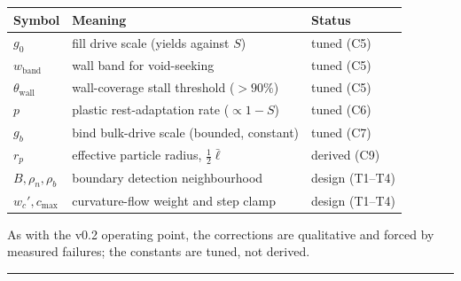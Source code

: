 \documentclass[11pt]{article}
\begin{document}
\begin{center}\small
\begin{tabular}{@{}lll@{}}
\toprule
Symbol & Meaning & Status \\
\midrule
$g_0$ & fill drive scale (yields against $S$) & tuned (C5) \\
$w_{\text{band}}$ & wall band for void-seeking & tuned (C5) \\
$\theta_{\text{wall}}$ & wall-coverage stall threshold ($>90\%$) & tuned (C5) \\
$p$ & plastic rest-adaptation rate ($\propto 1-S$) & tuned (C6) \\
$g_b$ & bind bulk-drive scale (bounded, constant) & tuned (C7) \\
$r_p$ & effective particle radius, $\tfrac{1}{2}\bar\ell$ & derived (C9) \\
$B, \rho_n, \rho_b$ & boundary detection neighbourhood & design (T1--T4) \\
$w_c', c_{\max}$ & curvature-flow weight and step clamp & design (T1--T4) \\
\bottomrule
\end{tabular}
\end{center}

\noindent As with the v0.2 operating point, the corrections are qualitative
and forced by measured failures; the constants are tuned, not derived.

\vspace{1em}
\noindent\textcolor{rule}{\rule{\linewidth}{0.8pt}}
\vspace{0.4em}

\end{document}
